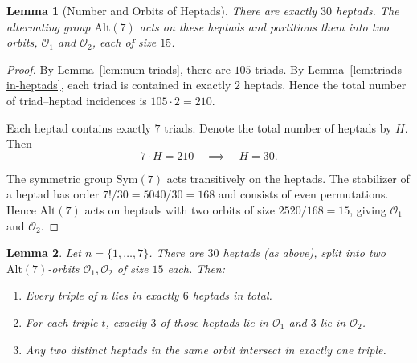 \documentclass[12pt,a4paper,openany]{book}
\newtheorem{lemma}{Lemma}[section]
\begin{document}
\begin{lemma}[Number and Orbits of Heptads]\label{lem:heptad-orbits}
There are exactly $30$ heptads. The alternating group $\mathrm{Alt}(7)$ acts on these heptads 
and partitions them into two orbits, $\mathcal{O}_1$ and $\mathcal{O}_2$, each of size $15$.
\end{lemma}

\begin{proof}
By Lemma~\ref{lem:num-triads}, there are $105$ triads.  
By Lemma~\ref{lem:triads-in-heptads}, each triad is contained in exactly $2$ heptads.  
Hence the total number of triad–heptad incidences is $105 \cdot 2 = 210$.  

Each heptad contains exactly $7$ triads. Denote the total number of heptads by $H$. Then
\[
7 \cdot H = 210 \quad \implies \quad H = 30.
\]

The symmetric group $\mathrm{Sym}(7)$ acts transitively on the heptads.  
The stabilizer of a heptad has order $7!/30 = 5040/30 = 168$ and consists of even permutations.  
Hence $\mathrm{Alt}(7)$ acts on heptads with two orbits of size $2520/168 = 15$, giving $\mathcal{O}_1$ and $\mathcal{O}_2$.
\end{proof}


\begin{lemma}\label{lem:triple-in-heptads}
Let $n=\{1,\dots,7\}$. There are $30$ heptads (as above), split into two
$\mathrm{Alt}(7)$-orbits $\mathcal O_1,\mathcal O_2$ of size $15$ each. Then:
\begin{enumerate}
  \item Every triple of $n$ lies in exactly $6$ heptads in total.
  \item For each triple $t$, exactly $3$ of those heptads lie in $\mathcal O_1$
        and $3$ lie in $\mathcal O_2$.
  \item Any two distinct heptads in the same orbit intersect in exactly one triple.
\end{enumerate}
\end{lemma}
\end{document}
